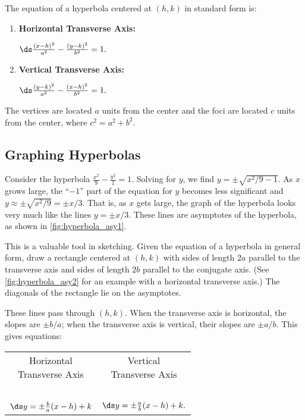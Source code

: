 {The equation of a hyperbola centered at $(h,k)$ in standard form is:
\begin{enumerate}
	\item \parbox{120pt}{\textbf{Horizontal Transverse Axis:}} $\ds \frac{(x-h)^2}{a^2} - \frac{(y-k)^2}{b^2} = 1.$
	\item	\parbox{120pt}{\textbf{Vertical Transverse Axis:}} $\ds \frac{(y-k)^2}{a^2}-\frac{(x-h)^2}{b^2} = 1.$
\end{enumerate}
The vertices are located $a$ units from the center and the foci are located $c$ units from the center, where $c^2 = a^2+b^2$.}

\subsection*{Graphing Hyperbolas}

Consider the hyperbola $\frac{x^2}9-\frac{y^2}1 = 1$. Solving for $y$, we find $y=\pm\sqrt{x^2/9-1}$. As $x$ grows large, the ``$-1$'' part of the equation for $y$ becomes less significant and $y\approx \pm\sqrt{x^2/9} = \pm x/3$. That is, as $x$ gets large, the graph of the hyperbola looks very much like the lines $y=\pm x/3$. These lines are asymptotes of the hyperbola, as shown in \autoref{fig:hyperbola_asy1}.

This is a valuable tool in sketching. Given the equation of a hyperbola in general form, draw a rectangle centered at $(h,k)$ with sides of length $2a$ parallel to the transverse axis and sides of length $2b$ parallel to the conjugate axis. (See \autoref{fig:hyperbola_asy2} for an example with a horizontal transverse axis.) The diagonals of the rectangle lie on the asymptotes. 

These lines pass through $(h,k)$.  When the transverse axis is horizontal, the slopes are $\pm b/a$; when the transverse axis is vertical, their slopes are $\pm a/b$. This gives equations:
\begin{center}
\begin{tabular}{cc}
\parbox{100pt}{\centering Horizontal \\ Transverse Axis} & \parbox{100pt}{\centering Vertical \\ Transverse Axis} \\ \ \\
$\ds y=\pm\frac ba(x-h)+k$  &$\ds  y=\pm\frac ab(x-h)+k.$
\end{tabular}
\end{center}

